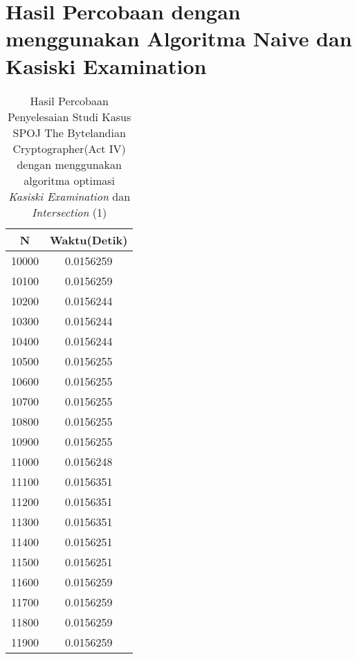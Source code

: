 \chapter{Hasil Percobaan dengan menggunakan Algoritma Naive dan Kasiski Examination}
\setcounter{table}{0}
  \renewcommand{\thetable}{B.\arabic{table}}
  \renewcommand{\thefigure}{B.\arabic{figure}}

\begin{table}[H]
\centering
\caption {Hasil Percobaan Penyelesaian Studi Kasus SPOJ The Bytelandian Cryptographer(Act IV) dengan menggunakan algoritma optimasi \textit{Kasiski Examination} dan \textit{Intersection} (1)}
\begin{tabular}{|c|c|}\hline
N&Waktu(Detik)\\ \hline
10000&0.0156259\\ \hline
10100&0.0156259\\ \hline
10200&0.0156244\\ \hline
10300&0.0156244\\ \hline
10400&0.0156244\\ \hline
10500&0.0156255\\ \hline
10600&0.0156255\\ \hline
10700&0.0156255\\ \hline
10800&0.0156255\\ \hline
10900&0.0156255\\ \hline
11000&0.0156248\\ \hline
11100&0.0156351\\ \hline
11200&0.0156351\\ \hline
11300&0.0156351\\ \hline
11400&0.0156251\\ \hline
11500&0.0156251\\ \hline
11600&0.0156259\\ \hline
11700&0.0156259\\ \hline
11800&0.0156259\\ \hline
11900&0.0156259\\ \hline
\end{tabular}
\label{tab:1res3}
\end{table}
